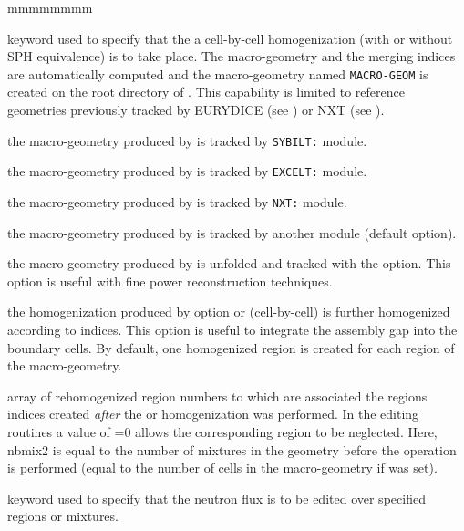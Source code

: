 \begin{ListeDeDescription}{mmmmmmmm}
\item[\moc{CELL}] keyword used to specify that the a cell-by-cell homogenization
(with or without SPH equivalence) is to take place. The macro-geometry and the merging indices are automatically
computed and the macro-geometry named {\tt MACRO-GEOM} is created on the root directory of . This
capability is limited to reference geometries previously tracked by EURYDICE (see ) or NXT (see 
).

\item[\moc{SYBIL}] the macro-geometry produced by  is tracked by {\tt SYBILT:} module.

\item[\moc{EXCELL}] the macro-geometry produced by  is tracked by {\tt EXCELT:} module.

\item[\moc{NXT}] the macro-geometry produced by  is tracked by {\tt NXT:} module.

\item[\moc{DEFAULT}] the macro-geometry produced by  is tracked by another module (default option).

\item[\moc{UNFOLD}] the macro-geometry produced by  is unfolded and tracked with the  option. This option is
useful with fine power reconstruction techniques.

\item[\moc{REMIX}] the homogenization produced by option   or   (cell-by-cell) is further
homogenized according to  indices. This option is useful to integrate the assembly gap into the boundary cells. By default, one homogenized region is created
for each region of the macro-geometry.

\item[\dusa{imix2}] array of rehomogenized region numbers to which are associated the regions indices created {\sl after}
the   or   homogenization was performed. In the editing routines a value of =0 allows the corresponding
region to be neglected. Here, nbmix2 is equal to the number of mixtures in the geometry before the  operation is performed (equal to the number
of cells in the macro-geometry if   was set).

\item[\moc{TAKE}] keyword used to specify that the neutron flux is to be edited
over specified regions or mixtures. 


\end{ListeDeDescription}
